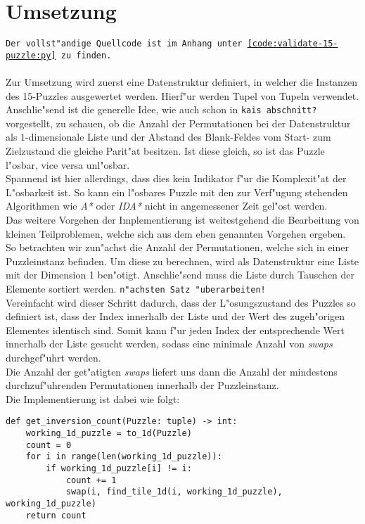 \section{Umsetzung} %
\label{cha:Umsetzung}
\texttt{Der vollst"andige Quellcode ist im Anhang unter \ref{code:validate-15-puzzle:py} zu finden.}\\\\
Zur Umsetzung wird zuerst eine Datenstruktur definiert, in welcher die Instanzen des 15-Puzzles ausgewertet werden. Hierf"ur werden Tupel von Tupeln verwendet.
Anschlie"send ist die generelle Idee, wie auch schon in \texttt{kais abschnitt?} vorgestellt, zu schauen, ob die Anzahl der Permutationen bei der Datenstruktur als $1$-dimensionale Liste und der Abstand des Blank-Feldes vom Start- zum Zielzustand die gleiche Parit"at besitzen.
Ist diese gleich, so ist das Puzzle l"osbar, vice versa unl"osbar.\\
Spannend ist hier allerdings, dass dies kein Indikator f"ur die Komplexit"at der L"osbarkeit ist. So kann ein l"osbares Puzzle mit den zur Verf"ugung stehenden Algorithmen wie \textit{A*} oder \textit{IDA*} nicht in angemessener Zeit gel"ost werden.\\
Das weitere Vorgehen der Implementierung ist weitestgehend die Bearbeitung von kleinen Teilproblemen, welche sich aus dem eben genannten Vorgehen ergeben.\\
So betrachten wir zun"achst die Anzahl der Permutationen, welche sich in einer Puzzleinstanz befinden. Um diese zu berechnen, wird als Datenstruktur eine Liste mit der Dimension 1 ben"otigt.
Anschlie"send muss die Liste durch Tauschen der Elemente sortiert werden.
\texttt{n"achsten Satz "uberarbeiten!}\\
Vereinfacht wird dieser Schritt dadurch, dass der L"osungszustand des Puzzles so definiert ist, dass der Index innerhalb der Liste und der Wert des zugeh"origen Elementes identisch sind. Somit kann f"ur jeden Index der entsprechende Wert innerhalb der Liste gesucht werden, sodass eine minimale Anzahl von \textit{swaps} durchgef"uhrt werden. \\Die Anzahl der get"atigten \textit{swaps} liefert uns dann die Anzahl der mindestens durchzuf"uhrenden Permutationen innerhalb der Puzzleinstanz.\\
Die Implementierung ist dabei wie folgt:
\begin{verbatim}
def get_inversion_count(Puzzle: tuple) -> int:
    working_1d_puzzle = to_1d(Puzzle)
    count = 0
    for i in range(len(working_1d_puzzle)):
        if working_1d_puzzle[i] != i:
            count += 1
            swap(i, find_tile_1d(i, working_1d_puzzle), working_1d_puzzle)
    return count
\end{verbatim}
